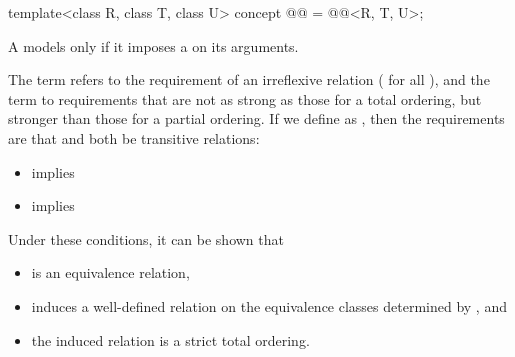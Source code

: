 \begin{itemdecl}
template<class R, class T, class U>
  concept @@ = @@<R, T, U>;
\end{itemdecl}

\begin{itemdescr}
\pnum
A  models  only if
it imposes a  on its arguments.

\pnum
The term
refers to the
requirement of an irreflexive relation ( for all ),
and the term
to requirements that are not as strong as
those for a total ordering,
but stronger than those for a partial
ordering.
If we define
as
,
then the requirements are that
and
both be transitive relations:

\begin{itemize}
\item
{}
implies
\item
{}
implies
\end{itemize}

\pnum
\begin{note}
Under these conditions, it can be shown that
\begin{itemize}
\item
{}
is an equivalence relation,
\item
{}
induces a well-defined relation on the equivalence
classes determined by
, and
\item
the induced relation is a strict total ordering.
\end{itemize}
\end{note}
\end{itemdescr}
